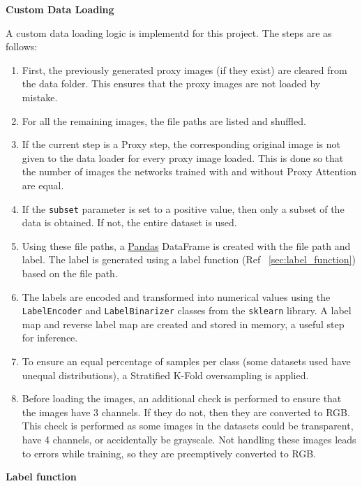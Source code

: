 \documentclass[a4paper,11pt,openright]{book}
\begin{document}
\textbf{Custom Data Loading}

A custom data loading logic is implementd for this project. The steps are as follows:
\begin{enumerate}
    \item First, the previously generated proxy images (if they exist) are cleared from the data folder. This ensures that the proxy images are not loaded by mistake.
    \item For all the remaining images, the file paths are listed and shuffled.
    \item If the current step is a Proxy step, the corresponding original image is not given to the data loader for every proxy image loaded. This is done so that the number of images the networks trained with and without Proxy Attention are equal.
    \item If the \lstinline[language=Python]{subset} parameter is set to a positive value, then only a subset of the data is obtained. If not, the entire dataset is used.
    \item Using these file paths, a \href{https://pandas.pydata.org/}{Pandas} DataFrame is created with the file path and label. The label is generated using a label function (Ref ~\ref{sec:label_function}) based on the file path.
    \item The labels are encoded and transformed into numerical values using the \lstinline[language=Python]{LabelEncoder} and \lstinline[language=Python]{LabelBinarizer} classes from the \lstinline[language=Python]{sklearn} library. A label map and reverse label map are created and stored in memory, a useful step for inference.
    \item To ensure an equal percentage of samples per class (some datasets used have unequal distributions), a Stratified K-Fold oversampling is applied.
    \item Before loading the images, an additional check is performed to ensure that the images have 3 channels. If they do not, then they are converted to RGB. This check is performed as some images in the datasets could be transparent, have 4 channels, or accidentally be grayscale. Not handling these images leads to errors while training, so they are preemptively converted to RGB.
\end{enumerate}

\textbf{Label function} \label{sec:label_function}
\end{document}
